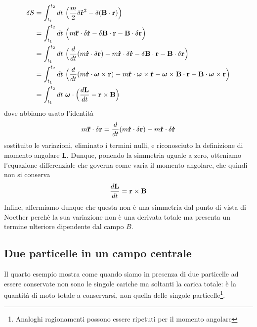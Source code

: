 \begin{example}
\begin{equation*}
\begin{aligned}
        \delta S & = \int_{t_1}^{t_2}dt~ \Big( \frac{m}{2} \delta \mathbf{\dot r}^2 - \delta (\mathbf B \cdot \mathbf r ) \Big ) \\ & = \int_{t_1}^{t_2}dt~ \Big( m \mathbf{\ddot r } \cdot \delta \mathbf{\dot r} - \delta \mathbf B \cdot \mathbf r - \mathbf B \cdot \delta \mathbf r \Big )  \\ & = \int_{t_1}^{t_2}dt~ \Big( \frac{d}{dt} (m \mathbf{\dot r} \cdot \delta \mathbf r) - m \mathbf{\dot r} \cdot \delta \mathbf{\dot r} - \delta \mathbf B \cdot \mathbf r - \mathbf B \cdot \delta \mathbf r \Big )  \\ & = \int_{t_1}^{t_2}dt~ \Big( \frac{d}{dt} (m \mathbf{\dot r} \cdot \boldsymbol \omega \times \mathbf r) - m \mathbf{\dot r} \cdot \boldsymbol \omega \times \mathbf{\dot r} - \boldsymbol \omega \times \mathbf B \cdot \mathbf r - \mathbf B \cdot \boldsymbol \omega \times \mathbf r \Big ) \\ & = \int_{t_1}^{t_2}dt~ \boldsymbol \omega \cdot \Big( \frac{d\mathbf L}{dt} - \mathbf r \times \mathbf B \Big)
    \end{aligned}
    \end{equation*} 
        dove abbiamo usato l'identità
    \begin{equation*}
        m \mathbf{\ddot r} \cdot \delta \mathbf r = \frac{d}{dt} (m \mathbf{\dot r} \cdot \delta \mathbf r) - m \mathbf{\dot r} \cdot \delta \mathbf{\dot r} 
    \end{equation*} 
        sostituito le variazioni, eliminato i termini nulli, e riconosciuto la definizione di momento angolare $\mathbf L$. Dunque, ponendo la simmetria uguale a zero, otteniamo l'equazione differenziale che governa come varia il momento angolare, che quindi non si conserva 
    \begin{equation*}
        \frac{d\mathbf L}{dt} = \mathbf r \times \mathbf B 
    \end{equation*}
        Infine, affermiamo dunque che questa non è una simmetria dal punto di vista di Noether perchè la sua variazione non è una derivata totale ma presenta un termine ulteriore dipendente dal campo $B$.
    \end{example}

\subsection{Due particelle in un campo centrale}

    Il quarto esempio mostra come quando siamo in presenza di due particelle ad essere conservate non sono le singole cariche ma soltanti la carica totale: è la quantità di moto totale a conservarsi, non quella delle singole particelle\footnote{Analoghi ragionamenti possono essere ripetuti per il momento angolare}. 

